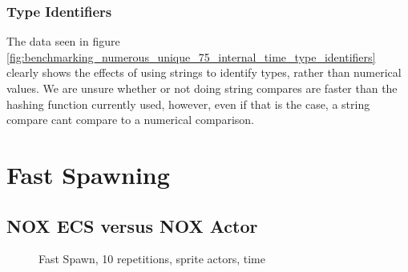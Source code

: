 \subsubsection{Type Identifiers}
The data seen in figure \ref{fig:benchmarking_numerous_unique_75_internal_time_type_identifiers} clearly shows the effects of using strings to identify
types, rather than numerical values.
We are unsure whether or not doing string compares are faster than the hashing function currently used, however, even if that is the case,
a string compare cant compare to a numerical comparison.


























\section{Fast Spawning}
\subsection{NOX ECS versus NOX Actor}
\begin{figure}[htb]
\centering
{}
\caption{Fast Spawn, 10 repetitions, sprite actors, time}
\label{fig:fast_spawn_10_sprite_time}
\end{figure}

